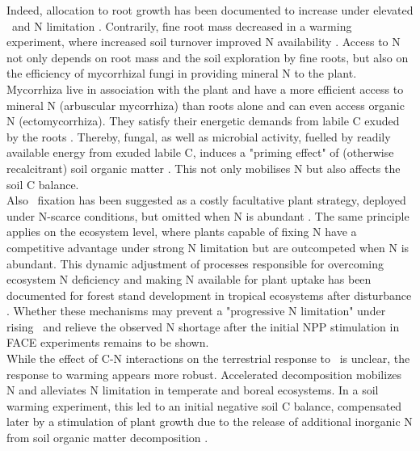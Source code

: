 Indeed, allocation to root growth has been documented to increase under elevated \coo\ and N limitation \citep{pregitzer08, iversen12, vangroenigen11}. Contrarily, fine root mass decreased in a warming experiment, where increased soil turnover improved N availability \citep{melillo11}. Access to N not only depends on root mass and the soil exploration by fine roots, but also on the efficiency of mycorrhizal fungi in providing mineral N to the plant. Mycorrhiza live in association with the plant and have a more efficient access to mineral N (arbuscular mycorrhiza) than roots alone and can even access organic N (ectomycorrhiza). They satisfy their energetic demands from labile C exuded by the roots \citep{phillips13}. Thereby, fungal, as well as microbial activity, fuelled by readily available energy from exuded labile C, induces a "priming effect" of (otherwise recalcitrant) soil organic matter \citep{fontaine07, cheng13, drake11}. This not only mobilises N but also affects the soil C balance.\\

Also \nn\ fixation has been suggested as a costly facultative plant strategy, deployed under N-scarce conditions, but omitted when N is abundant \citep{hedin09, barron11}. The same principle applies on the ecosystem level, where plants capable of fixing N have a competitive advantage under strong N limitation but are outcompeted when N is abundant. This dynamic adjustment of processes responsible for overcoming ecosystem N deficiency and making N available for plant uptake has been documented for forest stand development in tropical ecosystems after disturbance \citep{davidson07, yang11, batterman13}. Whether these mechanisms may prevent a "progressive N limitation" under rising \coo\ and relieve the observed N shortage after the initial NPP stimulation in FACE experiments remains to be shown.\\

While the effect of C-N interactions on the terrestrial response to \coo\ is unclear, the response to warming appears more robust. Accelerated decomposition mobilizes N \citep{bai13} and alleviates N limitation in temperate and boreal ecosystems. In a soil warming experiment, this led to an initial negative soil C balance, compensated later by a stimulation of plant growth due to the release of additional inorganic N from soil organic matter decomposition \citep{melillo11}.\\

